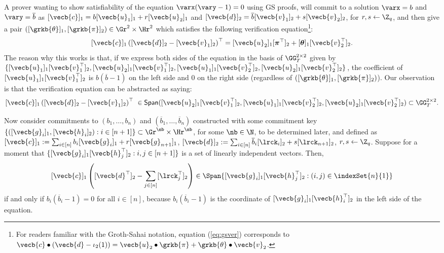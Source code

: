 A prover wanting to show satisfiability of the equation  $\varx(\vary-1)=0$ using GS proofs, will commit to a solution  
$\varx=b$ and $\vary=\overline{b}$ as $[\vecb{c}]_1=b [\vecb{u}_1]_1 + r [\vecb{u}_2]_1$ and 
 $[\vecb{d}]_2=\overline{b} [\vecb{v}_1]_2 + s [\vecb{v}_2]_2$, for $r,s \leftarrow \Z_q$, and then give a pair $([\grkb{\theta}]_1,[\grkb{\pi}]_2)
\in \Gr^{2} \times \Hr^{2}$ which satisfies the following verification equation\footnote{For readers familiar with the Groth-Sahai notation, equation (\ref{eq:gsver}) corresponds to 
$\vecb{c} \bullet \left(\vecb{d}-\iota_2(1)\right) = \vecb{u}_2 \bullet \grkb{\pi} + \grkb{\theta} \bullet \vecb{v}_2$.}:
\begin{equation} \label{eq:gsver}
[\vecb{c}]_1 \left([\vecb{d}]_2-
 [{\vecb{v}}_1]_2\right)^{\top}=[{\vecb{u}}_2]_1  
[{\boldsymbol \pi}^{\top}]_2+ [{\boldsymbol \theta}]_1   [\vecb{v}_2^{\top}]_2. 
\end{equation}
The reason why this works is that, if we express both sides of the equation in the basis of 
$\GG_T^{2\times 2}$ given by 
$\{[\vecb{u}_1]_1[\vecb{v}_1^\top]_2,[\vecb{u}_2]_1[\vecb{v}_1^\top]_2,[\vecb{u}_1]_1[\vecb{v}_2^\top]_2,[\vecb{u}_2]_1[\vecb{v}_2^\top]_2\}$, the coefficient of 
$[\vecb{u}_1]_1[\vecb{v}_1^\top]_2$ is $b(\overline{b}-1)$ on the left side and $0$ on the right side (regardless of
$([\grkb{\theta}]_1,[\grkb{\pi}]_2)$).
Our observation is that the verification equation can be abstracted as saying:
\begin{equation}\label{eq:gsabstracted}
[\vecb{c}]_1 \left([\vecb{d}]_2-[\vecb{v}_1]_2\right)^{\top} \ \in \mathsf{Span}([\vecb{u}_2]_1[\vecb{v}_1^\top]_2,[\vecb{u}_1]_1[\vecb{v}_2^\top]_2,[\vecb{u}_2]_1[\vecb{v}_2^\top]_2) \subset  \GG_T^{2 \times 2}. 
\end{equation}

Now consider commitments to $(b_1,\ldots,b_n)$ and $(\overline{b}_1,\ldots,\overline{b}_n)$ constructed with some commitment key $\{([\vecb{g}_i]_1,[\vecb{h}_i]_2): i \in [n+1]\}\subset\Gr^{\nb}\times\Hr^\nb$, for some $\nb\in\N$, to be determined later, and defined as $[\vecb{c}]_1:=\sum_{i \in [n]} b_i [\vecb{g}_i]_1 + r [\vecb{g}_{n+1}]_1$, 
$[\vecb{d}]_2:=\sum_{i \in [n]} \overline{b}_i [\lrck_i]_2 + s [{\lrck}_{n+1}]_2$, $r,s \gets \Z_q$. Suppose for a moment that 
$\{ [\vecb{g}_{i}]_1 [\vecb{h}_{j}^\top]_2 : i,j \in [n+1]\}$ 
is a set of linearly independent vectors. Then,  
\begin{equation} \label{eq:gsveri}
[\vecb{c}]_1 \left([\vecb{d}^\top]_2-
\sum_{j\in[n]} [\lrck_j^\top]_2\right) \in \Span\{ [\vecb{g}_i]_1[\vecb{h}_j^\top]_2: (i,j)\in\indexSet{n}{1} \} 
\end{equation}
if and only if $b_i(\overline{b}_i-1)=0$ for all $i \in [n]$,
because $b_i(\overline{b}_i-1)$ is the coordinate of 
$[\vecb{g}_i]_1[\vecb{h}_i^\top]_2$ in the left side of the equation.



